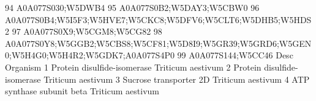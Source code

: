 \documentclass{beamer}
\begin{document}
\begin{frame}[fragile]
\begin{itemize}
\begin{Schunk}
\begin{Soutput}
94                                                                                                                                                                                                                                                                                                                                                              A0A077S030;W5DWB4
95                                                                                                                                                                                                                                                                                                                                                       A0A077S0B2;W5DAY3;W5CBW0
96                                                                                                                                                                                                                                                                                                                    A0A077S0B4;W5I5F3;W5HVE7;W5CKC8;W5DFV6;W5CLT6;W5DHB5;W5HDS2
97                                                                                                                                                                                                                                                                                                                                                       A0A077S0X9;W5CGM8;W5CG82
98                                                                                                                                                                                                                                                                                    A0A077S0Y8;W5GGB2;W5CBS8;W5CF81;W5D8I9;W5GR39;W5GRD6;W5GEN0;W5H4G0;W5H4R2;W5GDK7;A0A077S4P0
99                                                                                                                                                                                                                                                                                                                                                              A0A077S144;W5CC46
                                                     Desc          Organism
1                             Protein disulfide-isomerase Triticum aestivum
2                             Protein disulfide-isomerase Triticum aestivum
3                                  Sucrose transporter 2D Triticum aestivum
4                               ATP synthase subunit beta Triticum aestivum

\end{Soutput}
\end{Schunk}
\end{itemize}
\end{frame}
\end{document}
